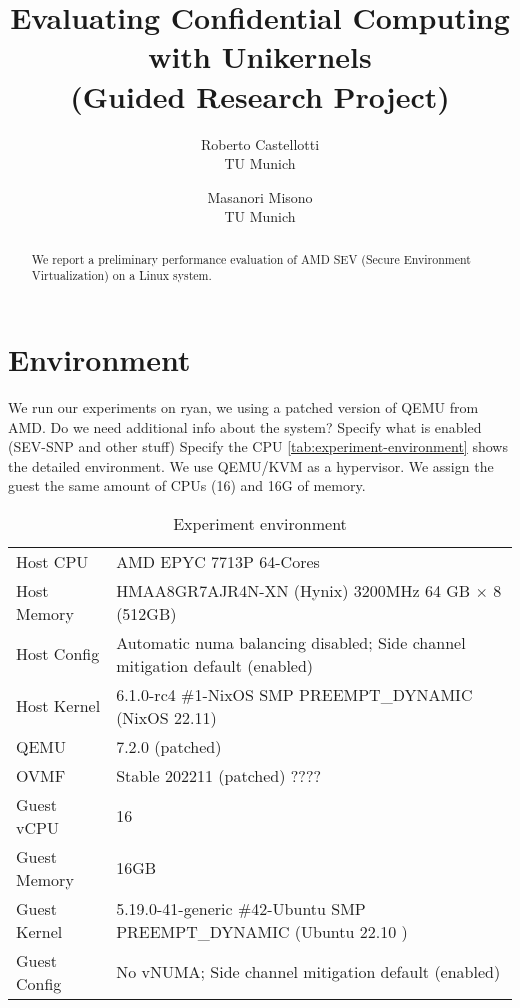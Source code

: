 \documentclass[letterpaper,twocolumn,10pt]{article}
\newcommand{\titlename}{
Evaluating Confidential Computing with Unikernels \\ (Guided Research Project)
}
\begin{document}
\date{}

\title{\Large \bf \titlename}

\author{
{\rm Roberto Castellotti}\\TU Munich
\and
{\rm Masanori Misono}\\TU Munich
}

\maketitle

\begin{abstract}
We report a preliminary performance evaluation of AMD SEV (Secure Environment Virtualization) on a Linux system.
\end{abstract}

\section{Environment}
We run our experiments on ryan, we using a patched version of QEMU from AMD.
Do we need additional info about the system?
Specify what is enabled (SEV-SNP and other stuff)
Specify the CPU
\autoref{tab:experiment-environment} shows the detailed environment.
We use QEMU/KVM as a hypervisor.
We assign the guest the same amount of CPUs (16) and 16G of memory.

\begin{table*}[t]
\centering
\caption{Experiment environment}
\label{tab:experiment-environment}
\begin{tabular}{l|l}
\toprule
    Host CPU      & AMD EPYC 7713P 64-Cores  \\
    Host Memory   & HMAA8GR7AJR4N-XN (Hynix) 3200MHz 64 GB $\times$ 8 (512GB) \\
    Host Config   & Automatic numa balancing disabled; Side channel mitigation default (enabled) \\
    Host Kernel   & 6.1.0-rc4 \#1-NixOS SMP PREEMPT\_DYNAMIC (NixOS 22.11) \\
    QEMU          & 7.2.0 (patched) \\
\midrule
    OVMF          & Stable 202211 (patched) ????  \\
    Guest vCPU    & 16 \\
    Guest Memory  & 16GB  \\
    Guest Kernel  & 5.19.0-41-generic \#42-Ubuntu SMP PREEMPT\_DYNAMIC (Ubuntu 22.10
    ) \\
    Guest Config  & No vNUMA; Side channel mitigation default (enabled) \\
\bottomrule
\end{tabular}
\end{table*}
\end{document}
